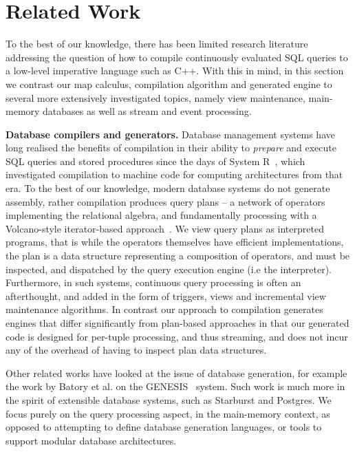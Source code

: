 \section{Related Work}

To the best of our knowledge, there has been limited research literature
addressing the question of how to compile continuously evaluated SQL queries to
a low-level imperative language such as C++.  With this in mind, in this section
we contrast our map calculus, compilation algorithm and generated engine to
several more extensively investigated topics, namely view maintenance,
main-memory databases as well as stream and event processing.

\textbf{Database compilers and generators.}
Database management systems have long realised the benefits of compilation in
their ability to \textit{prepare} and execute SQL queries and stored procedures
since the days of System R~\cite{chamberlin-tods:81}, which investigated
compilation to machine code for computing architectures from that era. To the
best of our knowledge, modern database systems do not generate assembly, rather
compilation produces query plans -- a network of operators implementing the
relational algebra, and fundamentally processing with a Volcano-style
iterator-based approach~\cite{graefe-tkde:94}. We view query plans as
interpreted programs, that is while the operators themselves have efficient
implementations, the plan is a data structure representing a composition of
operators, and must be inspected, and dispatched by the query execution engine
(i.e the interpreter). 
Furthermore, in such systems, continuous query processing
is often an afterthought, and added in the form of triggers, views and
incremental view maintenance algorithms. In contrast our approach to compilation
generates engines that differ significantly from plan-based approaches in that
our generated code is designed for per-tuple processing, and thus streaming, and
does not incur any of the overhead of having to inspect plan data structures.

Other related works have looked at the issue of database generation, for example
the work by Batory et al. on the GENESIS~\cite{batory-tse:88} system. Such work
is much more in the spirit of extensible database systems, such as Starburst and
Postgres. We focus purely on the query processing aspect, in the main-memory
context, as opposed to attempting to define database generation languages, or
tools to support modular database architectures.


